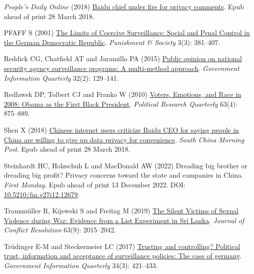 \documentclass[
  letterpaper,
  DIV=11,
  numbers=noendperiod]{scrartcl}
\newlength{\cslhangindent}
\newlength{\cslentryspacingunit} %
\newenvironment{CSLReferences}[2] %
 {%
  \setlength{\parindent}{0pt}
  \ifodd #1
  \let\oldpar\par
  \def\par{\hangindent=\cslhangindent\oldpar}
  \fi
  \setlength{\parskip}{#2\cslentryspacingunit}
 }%
 {}
\begin{document}
\begin{CSLReferences}{1}{0}
\leavevmode{}%
\emph{People's Daily Online} (2018)
\href{http://en.people.cn/n3/2018/0328/c90000-9442509.html}{Baidu chief
under fire for privacy comments}. Epub ahead of print 28 March 2018.

\leavevmode{}%
PFAFF S (2001) \href{https://doi.org/10.1177/1462474501003003003}{The
Limits of Coercive Surveillance: Social and Penal Control in the German
Democratic Republic}. \emph{Punishment \& Society} 3(3): 381--407.

\leavevmode{}%
Reddick CG, Chatfield AT and Jaramillo PA (2015)
\href{https://doi.org/10.1016/j.giq.2015.01.003}{Public opinion on
national security agency surveillance programs: A multi-method
approach}. \emph{Government Information Quarterly} 32(2): 129--141.

\leavevmode{}%
Redlawsk DP, Tolbert CJ and Franko W (2010)
\href{https://doi.org/10.1177/1065912910373554}{Voters, Emotions, and
Race in 2008: Obama as the First Black President}. \emph{Political
Research Quarterly} 63(4): 875--889.

\leavevmode{}%
Shen X (2018)
\href{https://www.scmp.com/abacus/tech/article/3028402/chinese-internet-users-criticize-baidu-ceo-saying-people-china-are}{Chinese
internet users criticize Baidu CEO for saying people in China are
willing to give up data privacy for convenience}. \emph{South China
Morning Post}. Epub ahead of print 28 March 2018.

\leavevmode{}%
Steinhardt HC, Holzschuh L and MacDonald AW (2022) Dreading big brother
or dreading big profit? Privacy concerns toward the state and companies
in China. \emph{First Monday}. Epub ahead of print 13 December 2022.
DOI:
\href{https://doi.org/10.5210/fm.v27i12.12679}{10.5210/fm.v27i12.12679}.

\leavevmode{}%
Traunmüller R, Kijewski S and Freitag M (2019)
\href{https://doi.org/10.1177/0022002719828053}{The Silent Victims of
Sexual Violence during War: Evidence from a List Experiment in Sri
Lanka}. \emph{Journal of Conflict Resolution} 63(9): 2015--2042.

\leavevmode{}%
Trüdinger E-M and Steckermeier LC (2017)
\href{https://doi.org/10.1016/j.giq.2017.07.003}{Trusting and
controlling? Political trust, information and acceptance of surveillance
policies: The case of germany}. \emph{Government Information Quarterly}
34(3): 421--433.


\end{CSLReferences}
\end{document}
